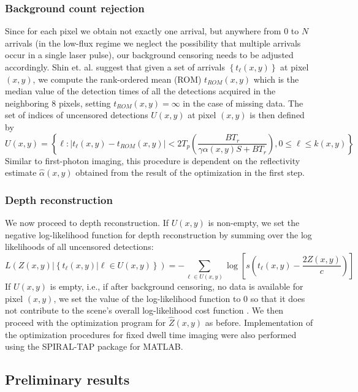 \subsubsection{Background count rejection}
Since for each pixel we obtain not exactly one arrival, but anywhere from $0$ to $N$ arrivals (in the low-flux regime we neglect the possibility that multiple arrivals occur in a single laser pulse), our background censoring needs to be adjusted accordingly. Shin et. al. \cite{kirmani-photon} suggest that given a set of arrivals $\left\{ t_\ell(x,y) \right\}$ at pixel $(x,y)$, we compute the rank-ordered mean (ROM) $t_{ROM}(x,y)$ which is the median value of the detection times of all the detections acquired in the neighboring 8 pixels, setting $t_{ROM}(x,y) = \infty$ in the case of missing data. The set of indices of uncensored detections $U(x,y)$ at pixel $(x,y)$ is then defined by
\begin{equation}
U(x,y) = \left\{ \ell : |t_\ell(x,y) - t_{ROM}(x,y)| < 2 T_p \left( \frac{BT_r}{\gamma \alpha(x,y)S + BT_r}  \right), 0 \leq \ell \leq k(x,y) \right\}
\end{equation}
Similar to first-photon imaging, this procedure is dependent on the reflectivity estimate $\hat{\alpha}(x,y)$ obtained from the result of the optimization in the first step.

\subsubsection{Depth reconstruction}
We now proceed to depth reconstruction. If $U(x,y)$ is non-empty, we set the negative log-likelihood function for depth reconstruction by summing over the log likelihoods of all uncensored detections:
\begin{equation}
L\left( Z(x,y) | \left\{t_\ell(x,y) | \ell \in U(x,y) \right\} \right) = - \sum_{\ell \in U(x,y)} \log\left[ s(t_\ell(x,y) - \frac{2Z(x,y)}{c}) \right]
\end{equation}
If $U(x,y)$ is empty, i.e., if after background censoring, no data is available for pixel $(x,y)$, we set the value of the log-likelihood function to $0$ so that it does not contribute to the scene's overall log-likelihood cost function \cite{kirmani-photon}. We then proceed with the optimization program for $\hat{Z}(x,y)$ as before. Implementation of the optimization procedures for fixed dwell time imaging were also performed using the SPIRAL-TAP package for MATLAB.

\subsection{Preliminary results}

